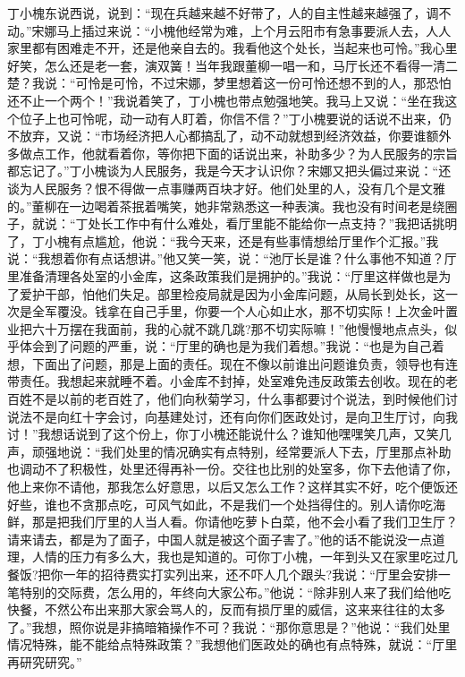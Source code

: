 \documentclass[12pt,oneside]{book}
\begin{document}
丁小槐东说西说，说到：``现在兵越来越不好带了，人的自主性越来越强了，调不动。''宋娜马上插过来说：``小槐他经常为难，上个月云阳市有急事要派人去，人人家里都有困难走不开，还是他亲自去的。我看他这个处长，当起来也可怜。''我心里好笑，怎么还是老一套，演双簧！当年我跟董柳一唱一和，马厅长还不看得一清二楚？我说：``可怜是可怜，不过宋娜，梦里想着这一份可怜还想不到的人，那恐怕还不止一个两个！''我说着笑了，丁小槐也带点勉强地笑。我马上又说：``坐在我这个位子上也可怜呢，动一动有人盯着，你信不信？''丁小槐要说的话说不出来，仍不放弃，又说：``市场经济把人心都搞乱了，动不动就想到经济效益，你要谁额外多做点工作，他就看着你，等你把下面的话说出来，补助多少？为人民服务的宗旨都忘记了。''丁小槐谈为人民服务，我是今天才认识你？宋娜又把头偏过来说：``还谈为人民服务？恨不得做一点事赚两百块才好。他们处里的人，没有几个是文雅的。''董柳在一边喝着茶抿着嘴笑，她非常熟悉这一种表演。我也没有时间老是绕圈子，就说：``丁处长工作中有什么难处，看厅里能不能给你一点支持？''我把话挑明了，丁小槐有点尴尬，他说：``我今天来，还是有些事情想给厅里作个汇报。''我说：``我想着你有点话想讲。''他又笑一笑，说：``池厅长是谁？什么事他不知道？厅里准备清理各处室的小金库，这条政策我们是拥护的。''我说：``厅里这样做也是为了爱护干部，怕他们失足。部里检疫局就是因为小金库问题，从局长到处长，这一次是全军覆没。钱拿在自己手里，你要一个人心如止水，那不切实际！上次金叶置业把六十万摆在我面前，我的心就不跳几跳?那不切实际嘛！''他慢慢地点点头，似乎体会到了问题的严重，说：``厅里的确也是为我们着想。''我说：``也是为自己着想，下面出了问题，那是上面的责任。现在不像以前谁出问题谁负责，领导也有连带责任。我想起来就睡不着。小金库不封掉，处室难免违反政策去创收。现在的老百姓不是以前的老百姓了，他们向秋菊学习，什么事都要讨个说法，到时候他们讨说法不是向红十字会讨，向基建处讨，还有向你们医政处讨，是向卫生厅讨，向我讨！''我想话说到了这个份上，你丁小槐还能说什么？谁知他嘿嘿笑几声，又笑几声，顽强地说：``我们处里的情况确实有点特别，经常要派人下去，厅里那点补助也调动不了积极性，处里还得再补一份。交往也比别的处室多，你下去他请了你，他上来你不请他，那我怎么好意思，以后又怎么工作？这样其实不好，吃个便饭还好些，谁也不贪那点吃，可风气如此，不是我们一个处挡得住的。别人请你吃海鲜，那是把我们厅里的人当人看。你请他吃萝卜白菜，他不会小看了我们卫生厅？请来请去，都是为了面子，中国人就是被这个面子害了。''他的话不能说没一点道理，人情的压力有多么大，我也是知道的。可你丁小槐，一年到头又在家里吃过几餐饭?把你一年的招待费实打实列出来，还不吓人几个跟头?我说：``厅里会安排一笔特别的交际费，怎么用的，年终向大家公布。''他说：``除非别人来了我们给他吃快餐，不然公布出来那大家会骂人的，反而有损厅里的威信，这来来往往的太多了。''我想，照你说是非搞暗箱操作不可？我说：``那你意思是？''他说：``我们处里情况特殊，能不能给点特殊政策？''我想他们医政处的确也有点特殊，就说：``厅里再研究研究。''
\end{document}

